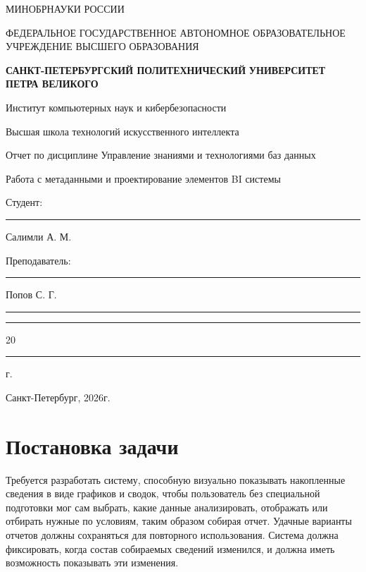 \documentclass[areasetadvanced]{scrartcl}
\begin{document}
\sloppy
	\thispagestyle{empty}
	\begin{center}
		\large{МИНОБРНАУКИ РОССИИ} \par
		\vspace{0.3cm}
		\normalsize
		{ФЕДЕРАЛЬНОЕ ГОСУДАРСТВЕННОЕ АВТОНОМНОЕ ОБРАЗОВАТЕЛЬНОЕ УЧРЕЖДЕНИЕ ВЫСШЕГО ОБРАЗОВАНИЯ} \par
		\vspace{0.3cm}
		\textbf{\guillemotleft САНКТ-ПЕТЕРБУРГСКИЙ ПОЛИТЕХНИЧЕСКИЙ}
		\textbf{УНИВЕРСИТЕТ ПЕТРА ВЕЛИКОГО\guillemotright} \par
		\vspace{0.3cm}
		{Институт компьютерных наук и кибербезопасности}\par
		{Высшая школа технологий искусственного интеллекта}\par
	\end{center}
	\vfill
	\begin{center}
		{\large Отчет по дисциплине \guillemotleft Управление знаниями и технологиями баз данных\guillemotright}\par
		
		\guillemotleft Работа с метаданными и проектирование элементов BI системы\guillemotright\par
         
	\end{center}
	\vfill
	\begin{flushleft}
		Студент: \hspace{1.8cm} \rule[0pt]{2.5cm}{0.5pt}\hfill Салимли А. М.\par
		\vspace{1.5cm}
		Преподаватель: \hspace{0.55cm} \rule[0pt]{2.5cm}{0.5pt}\hfill  Попов С. Г.
	\end{flushleft}
	\vspace{0.5cm}
	\begin{flushright}
		\guillemotleft \rule[0pt]{0.8cm}{0.5pt}\guillemotright \rule[0pt]{2cm}{0.5pt} 20\rule[0pt]{0.5cm}{0.5pt} г.
	\end{flushright}
	\vfill
	\begin{center}
		Санкт-Петербург, 2026г.
	\end{center}
	\newpage
	\tableofcontents
\newpage
\section{Постановка задачи}

Требуется разработать систему, способную визуально показывать накопленные сведения в виде графиков и сводок,
чтобы пользователь без специальной подготовки мог сам выбрать, 
какие данные анализировать, отображать или отбирать нужные по условиям, таким образом собирая отчет.
Удачные варианты отчетов должны сохраняться для повторного использования.
Система должна фиксировать, когда состав собираемых сведений изменился, и должна иметь возможность показывать эти изменения.
\end{document}

